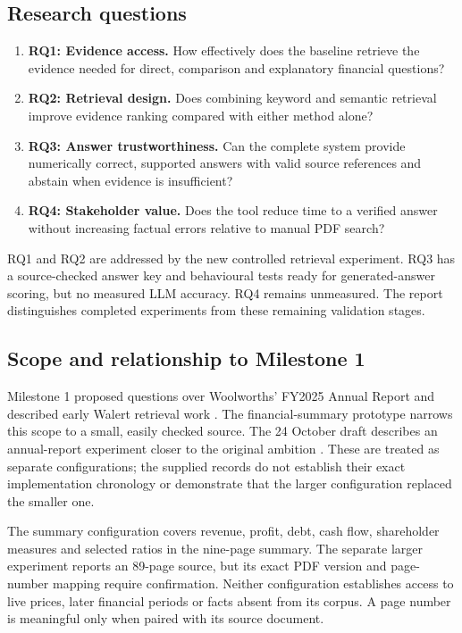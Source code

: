 \documentclass[11pt,a4paper]{article}
\begin{document}
\subsection{Research questions}
\begin{enumerate}
\item \textbf{RQ1: Evidence access.} How effectively does the baseline retrieve the evidence needed for direct, comparison and explanatory financial questions?
\item \textbf{RQ2: Retrieval design.} Does combining keyword and semantic retrieval improve evidence ranking compared with either method alone?
\item \textbf{RQ3: Answer trustworthiness.} Can the complete system provide numerically correct, supported answers with valid source references and abstain when evidence is insufficient?
\item \textbf{RQ4: Stakeholder value.} Does the tool reduce time to a verified answer without increasing factual errors relative to manual PDF search?
\end{enumerate}
RQ1 and RQ2 are addressed by the new controlled retrieval experiment. RQ3 has a source-checked answer key and behavioural tests ready for generated-answer scoring, but no measured LLM accuracy. RQ4 remains unmeasured. The report distinguishes completed experiments from these remaining validation stages.

\subsection{Scope and relationship to Milestone 1}
Milestone 1 proposed questions over Woolworths' FY2025 Annual Report and described early Walert retrieval work \cite{milestone}. The financial-summary prototype narrows this scope to a small, easily checked source. The 24 October draft describes an annual-report experiment closer to the original ambition \cite{vijay}. These are treated as separate configurations; the supplied records do not establish their exact implementation chronology or demonstrate that the larger configuration replaced the smaller one.

The summary configuration covers revenue, profit, debt, cash flow, shareholder measures and selected ratios in the nine-page summary. The separate larger experiment reports an 89-page source, but its exact PDF version and page-number mapping require confirmation. Neither configuration establishes access to live prices, later financial periods or facts absent from its corpus. A page number is meaningful only when paired with its source document.
\end{document}
